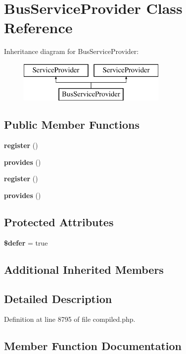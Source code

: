 \section{Bus\+Service\+Provider Class Reference}
\label{class_illuminate_1_1_bus_1_1_bus_service_provider}
Inheritance diagram for Bus\+Service\+Provider\+:\begin{figure}[H]
\begin{center}
\leavevmode
\includegraphics[height=2.000000cm]{class_illuminate_1_1_bus_1_1_bus_service_provider}
\end{center}
\end{figure}
\subsection*{Public Member Functions}
\begin{DoxyCompactItemize}
\item 
{\bf register} ()
\item 
{\bf provides} ()
\item 
{\bf register} ()
\item 
{\bf provides} ()
\end{DoxyCompactItemize}
\subsection*{Protected Attributes}
\begin{DoxyCompactItemize}
\item 
{\bf \$defer} = true
\end{DoxyCompactItemize}
\subsection*{Additional Inherited Members}


\subsection{Detailed Description}


Definition at line 8795 of file compiled.\+php.



\subsection{Member Function Documentation}
